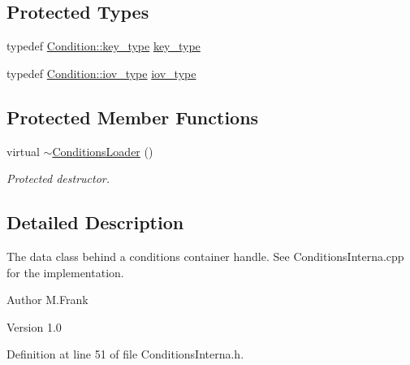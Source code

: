 \subsection*{Protected Types}
\begin{DoxyCompactItemize}
\item 
typedef \hyperlink{class_d_d4hep_1_1_conditions_1_1_condition_a7528efa762e8cc072ef80ea67c3531f9}{Condition::key\_\-type} \hyperlink{class_d_d4hep_1_1_conditions_1_1_conditions_loader_ac77fe60ee60373d61aed19b200949c93}{key\_\-type}
\item 
typedef \hyperlink{class_d_d4hep_1_1_i_o_v}{Condition::iov\_\-type} \hyperlink{class_d_d4hep_1_1_conditions_1_1_conditions_loader_a5647851492a3b1469208473fe6d96329}{iov\_\-type}
\end{DoxyCompactItemize}
\subsection*{Protected Member Functions}
\begin{DoxyCompactItemize}
\item 
virtual \hyperlink{class_d_d4hep_1_1_conditions_1_1_conditions_loader_aabdcec15084838715825303678ba3e69}{$\sim$ConditionsLoader} ()
\begin{DoxyCompactList}\small\item\em Protected destructor. \item\end{DoxyCompactList}\end{DoxyCompactItemize}


\subsection{Detailed Description}
The data class behind a conditions container handle. See ConditionsInterna.cpp for the implementation.

\begin{DoxyAuthor}{Author}
M.Frank 
\end{DoxyAuthor}
\begin{DoxyVersion}{Version}
1.0 
\end{DoxyVersion}


Definition at line 51 of file ConditionsInterna.h.

